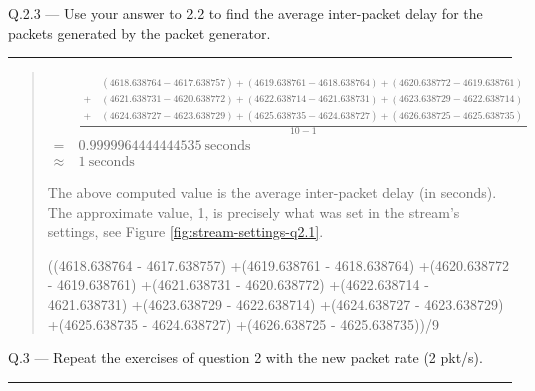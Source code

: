 \documentclass{article}
\newcommand\Que[2]{%
   \begin{samepage}
   \leavevmode\par
   \noindent
   Q.#1 --- #2\par\vspace{10pt}\hrule\vspace{10pt}
   \end{samepage}}
\newenvironment{ans}
   {\fbox{Answer}\begin{quote}\nopagebreak}
   {\end{quote}}
\begin{document}
\Que{2.3}{Use your answer to 2.2 to find the average
inter-packet delay for the packets generated by the packet
generator.}
\begin{ans}

$$
\begin{aligned}
&\frac{
\begin{aligned}
&(4618.638764 - 4617.638757)
+(4619.638761 - 4618.638764)
+(4620.638772 - 4619.638761)\\
+\ &(4621.638731 - 4620.638772)
+(4622.638714 - 4621.638731)
+(4623.638729 - 4622.638714)\\
+\ &(4624.638727 - 4623.638729)
+(4625.638735 - 4624.638727)
+(4626.638725 - 4625.638735)
\end{aligned}
}{10 - 1}\\
=\ & 0.9999964444444535\ \text{seconds}\\
\approx\ & 1\ \text{seconds}
\end{aligned}
 $$

 The above computed value is the average inter-packet delay (in
 seconds). The approximate value, 1, is precisely what was set
 in the stream's settings, see Figure
 \ref{fig:stream-settings-q2.1}.

\begin{gruvboxlisting}[language=Python, caption={Python
   expression for calculating the inter-packet delay for
Question 2.3.}]
((4618.638764 - 4617.638757)
+(4619.638761 - 4618.638764)
+(4620.638772 - 4619.638761)
+(4621.638731 - 4620.638772)
+(4622.638714 - 4621.638731)
+(4623.638729 - 4622.638714)
+(4624.638727 - 4623.638729)
+(4625.638735 - 4624.638727)
+(4626.638725 - 4625.638735))/9
\end{gruvboxlisting}

\end{ans}

\newpage

\Que{3}{Repeat the exercises of question 2 with the new packet
rate (2 pkt/s).}
\end{document}
